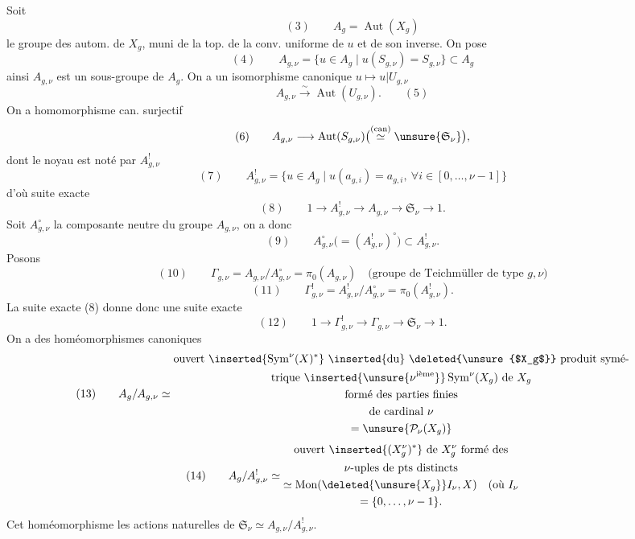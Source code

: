 Soit
\[
(3)\qquad A_g=\operatorname{Aut}(X_g)
\]
le groupe des autom. de $X_g$, muni de la
top. de la conv. uniforme de $u$ et de son
inverse. On pose
\[
(4)\qquad A_{g,\nu}=\{u\in A_g\mid u(S_{g,\nu})=S_{g,\nu}\}\subset A_g
\]
ainsi $A_{g,\nu}$ est un sous-groupe de $A_g$. On
a un isomorphisme canonique $u\mapsto u|U_{g,\nu}$
\[
A_{g,\nu}\xrightarrow{\sim}\operatorname{Aut}(U_{g,\nu}).\qquad(5)
\]
 On a  homomorphisme can. surjectif
\[
(6)\qquad A_{g,\nu}\longrightarrow\operatorname{Aut}(S_{g,\nu})
\bigl(\overset{\text{(can)}}{\simeq}\unsure{\mathfrak S_\nu}\bigr),
\]
dont le noyau est noté par $A_{g,\nu}^!$
\[
(7)\qquad A_{g,\nu}^!=\{u\in A_g\mid u(a_{g,i})=a_{g,i},\ \forall i\in[0,\ldots,\nu-1]\}
\]
d'où suite exacte
\[
(8)\qquad 1\longrightarrow A_{g,\nu}^!\longrightarrow A_{g,\nu}
\longrightarrow\mathfrak S_\nu\longrightarrow1.
\]
Soit $A_{g,\nu}^{\circ}$ la composante neutre du groupe
$A_{g,\nu}$, on a donc
\[
(9)\qquad A_{g,\nu}^{\circ}\bigl(=(A_{g,\nu}^!)^{\circ}\bigr)\subset A_{g,\nu}^!.
\]
Posons
\[
(10)\qquad \Gamma_{g,\nu}=A_{g,\nu}/A_{g,\nu}^{\circ}=\pi_0(A_{g,\nu})
\quad\text{(groupe de Teichmüller de type }g,\nu\text{)}
\]
\[
(11)\qquad \Gamma_{g,\nu}^!=A_{g,\nu}^!/A_{g,\nu}^{\circ}=\pi_0(A_{g,\nu}^!).
\]
La suite exacte (8) donne donc une suite
exacte
\[
(12)\qquad 1\longrightarrow\Gamma_{g,\nu}^!\longrightarrow\Gamma_{g,\nu}
\longrightarrow\mathfrak S_\nu\longrightarrow1.
\]
On a des homéomorphismes canoniques
\[
(13)\qquad A_g/A_{g,\nu}\simeq
\begin{gathered}
\text{ouvert }\inserted{\operatorname{Sym}^{\nu}(X)^*}\text{ \inserted{du} \deleted{\unsure{$X_g$}} produit symé-}\\
\text{trique }\inserted{\unsure{\nu^{\text{ième}}}}\operatorname{Sym}^{\nu}(X_g)\text{ de }X_g\\
\text{formé des parties finies}\\
\text{de cardinal }\nu\\
=\unsure{\mathcal P_\nu(X_g)}
\end{gathered}
\]
\[
(14)\qquad A_g/A_{g,\nu}^!\simeq
\begin{gathered}
\text{ouvert }\inserted{(X_g^{\nu})^*}\text{ de }X_g^{\nu}\text{ formé des}\\
\nu\text{-uples de pts distincts}\\
\simeq\operatorname{Mon}(\deleted{\unsure{X_g}}I_\nu,X)\quad\text{(où }I_\nu\\
=\{0,\ldots,\nu-1\}.
\end{gathered}
\]
Cet homéomorphisme  les actions
naturelles de $\mathfrak S_\nu\simeq A_{g,\nu}/A_{g,\nu}^!$.

